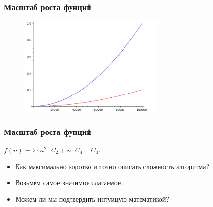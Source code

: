 \documentclass[russian, 12pt]{beamer}
\begin{document}
\begin{frame}
\frametitle{Масштаб роста фунций}
\begin{figure}
  \includegraphics[width=\linewidth, height=5cm]{img/complexity_6.png}
\end{figure}
\end{frame}
\begin{frame}
\frametitle{Масштаб роста фунций}
$f(n) = 2\cdot n^2 \cdot C_2 + n \cdot C_4 + C_3.$\\[0.3cm]
\begin{itemize}
  \pause
  \item Как максимально коротко и точно описать сложность алгоритма?\\[0.3cm]
  \pause
  \item Возьмем самое значимое слагаемое.\\[0.3cm]
  \pause
  \item Можем ли мы подтвердить интуицую математикой?
\end{itemize}
\end{frame}
\end{document}
